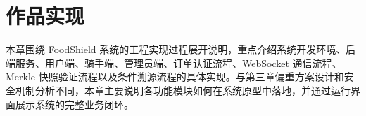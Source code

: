 %
%
\section{作品实现}

本章围绕 FoodShield 系统的工程实现过程展开说明，重点介绍系统开发环境、后端服务、用户端、骑手端、管理员端、订单认证流程、WebSocket 通信流程、Merkle 快照验证流程以及条件溯源流程的具体实现。与第三章偏重方案设计和安全机制分析不同，本章主要说明各功能模块如何在系统原型中落地，并通过运行界面展示系统的完整业务闭环。




















